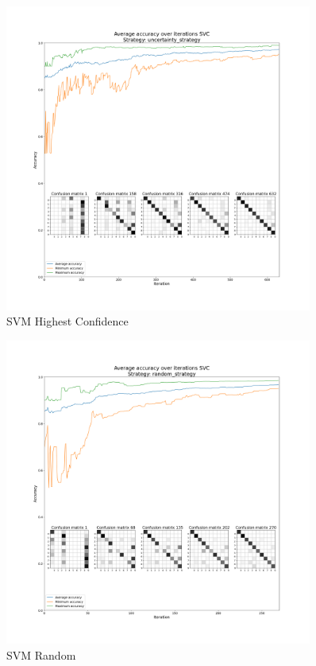 \begin{figure}[htbp]
\centering
\includegraphics[width=0.9\textwidth]{resources/images/active_learning_SVC_uncertainty_strategy_average.png}
\caption{SVM Highest Confidence}
\end{figure}

\begin{figure}[htbp]
\centering
\includegraphics[width=0.9\textwidth]{resources/images/active_learning_SVC_random_strategy_average.png}
\caption{SVM Random}
\end{figure}

